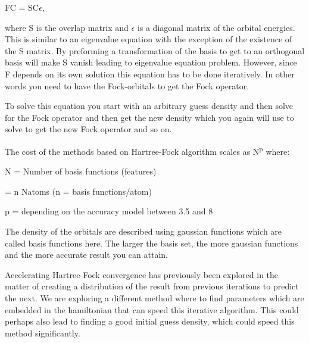 \documentclass[twoside]{article}
\begin{document}

% 
% 


FC = SC$\epsilon$,

where S is the overlap matrix and $\epsilon$ is a diagonal matrix of the orbital energies. This is similar to an eigenvalue equation with the exception of the existence of the S matrix. By preforming a transformation of the basis to get to an orthogonal basis will make S vanish leading to eigenvalue equation problem. However, since F depends on its own solution this equation has to be done iteratively. In other words you need to have the Fock-orbitals to get the Fock operator. 

To solve this equation you start with an arbitrary guess density and then solve for the Fock operator and then get the new density which you again will use to solve to get the new Fock operator and so on. 

The cost of the methods based on Hartree-Fock algorithm scales as N\textsuperscript{p} where: 

N = Number of basis functions (features) 

= n Natoms  (n = basis functions/atom)  

p  = depending on the accuracy model between 3.5 and 8\cite{frisch1996exploring}



The density of the orbitals are described using gaussian functions which are called basis functions here. The larger the basis set, the more gaussian functions and the more accurate result you can attain.

Accelerating Hartree-Fock convergence has previously been explored in the matter of creating a distribution of the result from previous iterations to predict the next\cite{Pulay1980}. We are exploring a different method where to find parameters which are embedded in the hamiltonian that can speed this iterative algorithm. This could perhaps also lead to finding a good initial guess density, which could speed this method significantly. 
\end{document}
